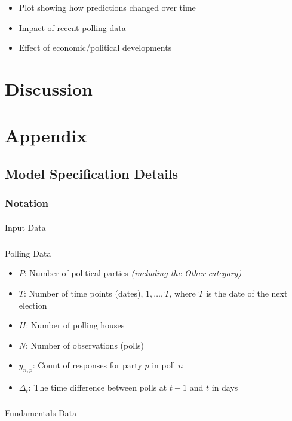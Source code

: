 \documentclass[
  letterpaper,
  DIV=11,
  numbers=noendperiod]{scrartcl}
\makeatletter
\let\oldparagraph\paragraph
\renewcommand{\paragraph}{
    \@ifstar
      \xxxParagraphStar
      \xxxParagraphNoStar
  }
\newcommand{\xxxParagraphStar}[1]{\oldparagraph*{#1}\mbox{}}
\newcommand{\xxxParagraphNoStar}[1]{\oldparagraph{#1}\mbox{}}
\let\oldsubparagraph\subparagraph
\renewcommand{\subparagraph}{
    \@ifstar
      \xxxSubParagraphStar
      \xxxSubParagraphNoStar
  }
\newcommand{\xxxSubParagraphStar}[1]{\oldsubparagraph*{#1}\mbox{}}
\newcommand{\xxxSubParagraphNoStar}[1]{\oldsubparagraph{#1}\mbox{}}
\providecommand{\tightlist}{%
  \setlength{\itemsep}{0pt}\setlength{\parskip}{0pt}}\usepackage{longtable,booktabs,array}
\makeatother
\begin{document}
\begin{itemize}
\tightlist
\item
  Plot showing how predictions changed over time
\item
  Impact of recent polling data
\item
  Effect of economic/political developments
\end{itemize}

\section{Discussion}\label{discussion}

\section{Appendix}\label{appendix}

\subsection{Model Specification
Details}\label{model-specification-details}

\subsubsection{Notation}\label{notation}

\paragraph{Input Data}\label{input-data}

\subparagraph{Polling Data}\label{polling-data}

\begin{itemize}
\tightlist
\item
  \(P\): Number of political parties \emph{(including the Other
  category)}
\item
  \(T\): Number of time points (dates), \(1, \dots, T\), where \(T\) is
  the date of the next election
\item
  \(H\): Number of polling houses
\item
  \(N\): Number of observations (polls)
\item
  \(y_{n,p}\): Count of responses for party \(p\) in poll \(n\)
\item
  \(\Delta_t\): The time difference between polls at \(t-1\) and \(t\)
  in days
\end{itemize}

\subparagraph{Fundamentals Data}\label{fundamentals-data}
\end{document}
